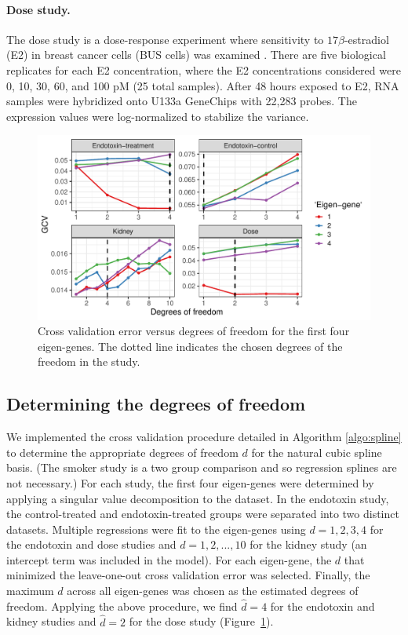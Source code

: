 \documentclass[11pt]{article}
\begin{document}
\paragraph{Dose study.} The dose study is a dose-response experiment where sensitivity to $17\beta$-estradiol (E2) in breast cancer cells (BUS cells) was examined \citep{coser2003}. There are five biological replicates for each E2 concentration, where the E2 concentrations considered were 0, 10, 30, 60, and 100 pM (25 total samples). After 48 hours exposed to E2, RNA samples were hybridized onto U133a GeneChips with 22,283 probes. The expression values were log-normalized to stabilize the variance.

\begin{figure}
\centering
\includegraphics[scale = 0.55]{../analysis/figures/basis_dimension.pdf}  
\caption{Cross validation error versus degrees of freedom for the first four eigen-genes. The dotted line indicates the chosen degrees of the freedom in the study.}
\label{fig:cve}
\end{figure}

\subsection{Determining the degrees of freedom}

We implemented the cross validation procedure detailed in Algorithm \ref{algo:spline} to determine the appropriate degrees of freedom $d$ for the natural cubic spline basis. (The smoker study is a two group comparison and so regression splines are not necessary.) For each study, the first four eigen-genes were determined by applying a singular value decomposition to the dataset. In the endotoxin study, the control-treated and endotoxin-treated groups were separated into two distinct datasets. Multiple regressions were fit to the eigen-genes using $d=1,2,3,4$ for the endotoxin and dose studies and $d = 1,2,...,10$ for the kidney study (an intercept term was included in the model). For each eigen-gene, the $d$ that minimized the leave-one-out cross validation error was selected. Finally, the maximum $d$ across all eigen-genes was chosen as the estimated degrees of freedom.  Applying the above procedure, we find $\hat{d} = 4$ for the endotoxin and kidney studies and $\hat{d} = 2$ for the dose study (Figure~\ref{fig:cve}).
\end{document}

